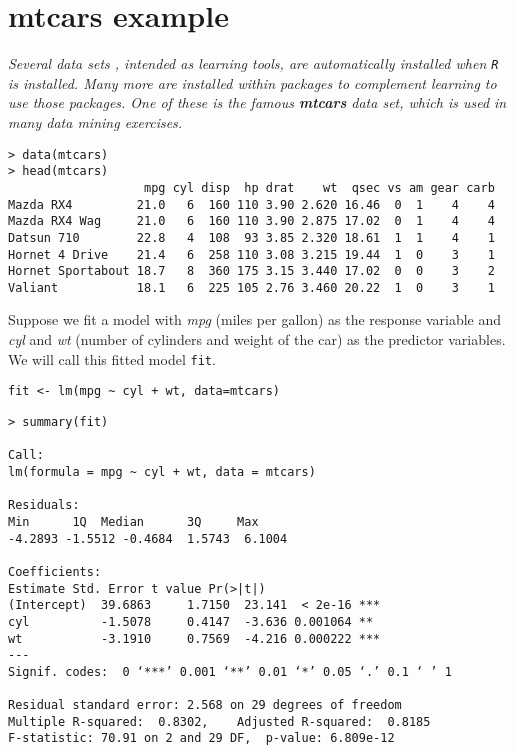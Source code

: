 \documentclass[residuals.tex]{subfiles}
\begin{document}
\Large	
\section{mtcars example} %

\textit{Several data sets , intended as learning tools, are automatically installed when \texttt{R} is installed. Many more are installed within packages to complement learning to use those packages. One of these is the famous \textbf{\textit{mtcars}} data set, which is used in many data mining exercises.}
{
	\large
\begin{framed}
\begin{verbatim}
> data(mtcars)
> head(mtcars)
                   mpg cyl disp  hp drat    wt  qsec vs am gear carb
Mazda RX4         21.0   6  160 110 3.90 2.620 16.46  0  1    4    4
Mazda RX4 Wag     21.0   6  160 110 3.90 2.875 17.02  0  1    4    4
Datsun 710        22.8   4  108  93 3.85 2.320 18.61  1  1    4    1
Hornet 4 Drive    21.4   6  258 110 3.08 3.215 19.44  1  0    3    1
Hornet Sportabout 18.7   8  360 175 3.15 3.440 17.02  0  0    3    2
Valiant           18.1   6  225 105 2.76 3.460 20.22  1  0    3    1

\end{verbatim}
\end{framed}
}

\noindent Suppose we fit a model with \textit{mpg} (miles per gallon) as the response variable and \textit{cyl} and \textit{wt} (number of cylinders and weight of the car)
as the predictor variables. We will call this fitted model \texttt{fit}.


\begin{framed}
\begin{verbatim}
fit <- lm(mpg ~ cyl + wt, data=mtcars)
\end{verbatim}
\end{framed}
\newpage
\begin{verbatim}
> summary(fit)

Call:
lm(formula = mpg ~ cyl + wt, data = mtcars)

Residuals:
Min      1Q  Median      3Q     Max 
-4.2893 -1.5512 -0.4684  1.5743  6.1004 

Coefficients:
Estimate Std. Error t value Pr(>|t|)    
(Intercept)  39.6863     1.7150  23.141  < 2e-16 ***
cyl          -1.5078     0.4147  -3.636 0.001064 ** 
wt           -3.1910     0.7569  -4.216 0.000222 ***
---
Signif. codes:  0 ‘***’ 0.001 ‘**’ 0.01 ‘*’ 0.05 ‘.’ 0.1 ‘ ’ 1

Residual standard error: 2.568 on 29 degrees of freedom
Multiple R-squared:  0.8302,    Adjusted R-squared:  0.8185 
F-statistic: 70.91 on 2 and 29 DF,  p-value: 6.809e-12
\end{verbatim}
\newpage
\end{document}
